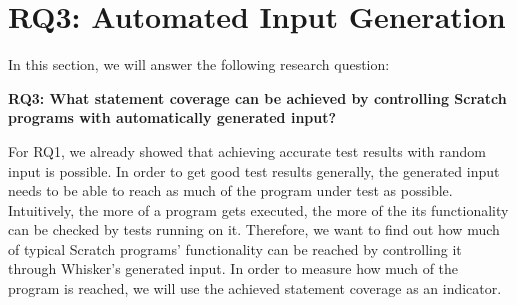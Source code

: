 
\section{RQ3: Automated Input Generation}
\label{sec:rq3}

In this section, we will answer the following research question:

\begin{center}\begin{minipage}{.9\textwidth}
    \textbf{RQ3: What statement coverage can be achieved by controlling Scratch programs with automatically generated input?}
\end{minipage}\end{center}

\noindent For RQ1, we already showed that achieving accurate test results with random input is possible.
In order to get good test results generally, the generated input needs to be able to reach as much of the program under test as possible.
Intuitively, the more of a program gets executed, the more of the its functionality can be checked by tests running on it.
Therefore, we want to find out how much of typical Scratch programs' functionality can be reached by controlling it through Whisker's generated input.
In order to measure how much of the program is reached, we will use the achieved statement coverage as an indicator.
\parspace

